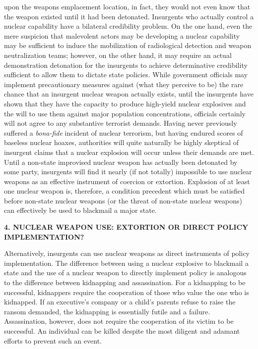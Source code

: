 upon the weapons emplacement location, in fact, they would not even know that
the weapon existed until it had been detonated.
\bigskip
Insurgents who actually control a nuclear capability have a bilateral 
credibility problem. On the one hand, even the mere suspicion that malevolent
actors may be developing a nuclear capability may be sufficient to induce
the mobilization of radiological detection and weapon neutralization teams;
however, on the other hand, it may require an actual demonstration 
detonation for the insurgents to achieve determinative credibility 
sufficient to allow them to dictate state policies. While government officials
may implement precautionary measures against (what they perceive to be) the
rare chance that an insurgent nuclear weapon actually exists, until the
insurgents have shown that they have the capacity to produce high-yield
nuclear explosives and the will to use them against major population 
concentrations, officials certainly will not agree to any substantive
terrorist demands. Having never previously suffered a {\it bona-fide}
incident of nuclear terrorism, but having endured scores of baseless nuclear
hoaxes, authorities will quite naturally be highly skeptical of insurgent
claims that a nuclear explosion will occur unless their demands are met.
Until a non-state improvised nuclear weapon has actually been detonated by some
party, insurgents will find it nearly (if not totally) impossible to use
nuclear weapons as an effective instrument of coercion or extortion. Explosion
of at least one nuclear weapon is, therefore, a condition precedent which must
be satisfied before non-state nuclear weapons (or the threat of non-state
nuclear weapons) can effectively be used to blackmail a major state. 
\bigskip\bigskip
\centerline{\bf 4. 
NUCLEAR WEAPON USE: EXTORTION OR DIRECT POLICY IMPLEMENTATION?}
\bigskip
Alternatively, insurgents can use nuclear weapons as direct instruments of
policy implementation. The difference between using a nuclear explosive to 
blackmail a state and the use of a nuclear weapon to directly implement
policy is analogous to the difference between kidnapping and assassination.
For a kidnapping to be successful, kidnappers require the cooperation of those
who value the one who is kidnapped. If an executive's company or a child's
parents refuse to raise the ransom demanded, the kidnapping is essentially
futile and a failure. Assassination, however, does not require the
cooperation of its victim to be successful. An individual can be killed 
despite the most diligent and adamant efforts to prevent such an event.
